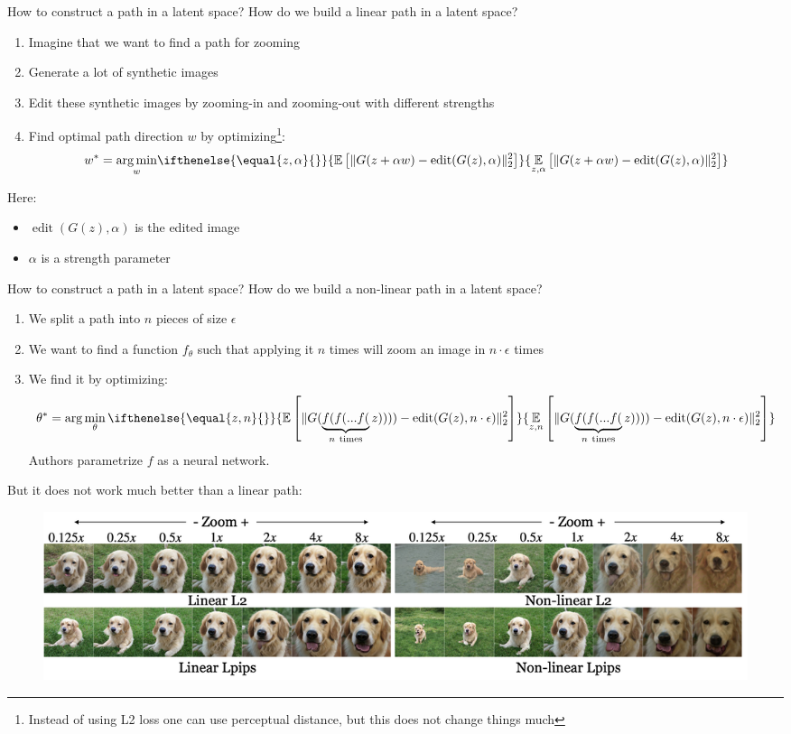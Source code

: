 \documentclass[10pt]{beamer}
\newcommand{\expect}[2][]{
\ifthenelse{\equal{#1}{}}{
\mathbb{E}\left[#2\right]
}{
\underset{#1}{\mathbb{E}}\left[#2\right]
}}
\begin{document}
\begin{frame}{How to construct a path in a latent space?}
    How do we build a linear path in a latent space?
    
    \begin{enumerate}
        \item\pause Imagine that we want to find a path for zooming
        \item\pause Generate a lot of synthetic images
        \item\pause Edit these synthetic images by zooming-in and zooming-out with different strengths
        \item\pause Find optimal path direction $w$ by optimizing\footnote{Instead of using L2 loss one can use perceptual distance, but this does not change things much}:
        \begin{equation}
w^{*}=\underset{w}{\arg \min } \expect[z, \alpha]{\| G(z+\alpha w) - \operatorname{edit}(G(z), \alpha) \|_2^2}
\end{equation}
    \end{enumerate}
    Here:
    \begin{itemize}
        \item $\operatorname{edit}(G(z), \alpha)$ is the edited image
        \item $\alpha$ is a strength parameter
    \end{itemize}
\end{frame}

\begin{frame}{How to construct a path in a latent space?}
How do we build a non-linear path in a latent space?

\begin{enumerate}
    \item\pause We split a path into $n$ pieces of size $\epsilon$
    \item\pause We want to find a function $f_\theta$ such that applying it $n$ times will zoom an image in $n \cdot \epsilon$ times
    \item\pause We find it by optimizing:
    \begin{equation*}
        \theta^* = \arg\min_\theta \expect[z, n]{\| G(\underbrace{f(f(...f(}_{n\ \text{times}}z)))) - \operatorname{edit}(G(z), n\cdot\epsilon)\|_2^2}
    \end{equation*}
    Authors parametrize $f$ as a neural network.
\end{enumerate}

\pause
But it does not work much better than a linear path:
\begin{figure}
    \centering
    \includegraphics[width=\textwidth]{images/gan-steerability-linear-vs-nonlinear.png}
\end{figure}

\end{frame}
\end{document}
